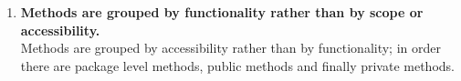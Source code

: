 \documentclass[a4paper,11pt]{report} %
\begin{document}
\begin{enumerate}[resume]
				
			\item \textbf{Methods are grouped by functionality rather than by scope or accessibility.}\smallskip \\
				Methods are grouped by accessibility rather than by functionality; in order there are package level methods, public methods and finally private methods.
			\setcounter{enumi}{27}
		\end{enumerate}
		
\end{document}

